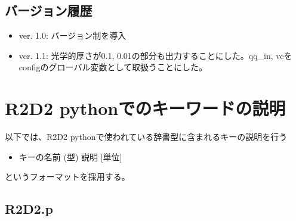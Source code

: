 \documentclass[letterpaper,10pt,dvipdfmx,report]{sphinxmanual}
\begin{document}
\section{バージョン履歴}
\label{\detokenize{io:id6}}\begin{itemize}
\item {} 
ver. 1.0: バージョン制を導入

\item {} 
ver. 1.1: 光学的厚さが0.1, 0.01の部分も出力することにした。qq\_in, vcをconfigのグローバル変数として取扱うことにした。

\end{itemize}


\chapter{R2D2 pythonでのキーワードの説明}
\label{\detokenize{notation:r2d2-python}}\label{\detokenize{notation::doc}}
以下では、R2D2 pythonで使われている辞書型に含まれるキーの説明を行う
\begin{itemize}
\item {} 
キーの名前 (型) \sphinxhyphen{}\sphinxhyphen{} 説明 {[}単位{]}

\end{itemize}

というフォーマットを採用する。


\section{R2D2.p}
\label{\detokenize{notation:r2d2-p}}
\end{document}
